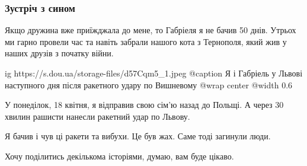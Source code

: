  
 
 
 
 

\subsubsection{Зустріч з сином}

Якщо дружина вже приїжджала до мене, то Габріеля я не бачив 50 днів. Утрьох ми
гарно провели час та навіть забрали нашого кота з Тернополя, який жив у наших
друзів з початку війни.

\ifcmt
  ig https://s.dou.ua/storage-files/d57Cqm5_1.jpeg
	@caption Я і Габріель у Львові наступного дня після ракетного удару по Вишневому
  @wrap center
  @width 0.6
\fi

У понеділок, 18 квітня, я відправив свою сім'ю назад до Польщі. А через 30
хвилин рашисти нанесли ракетний удар по Львову.

Я бачив і чув ці ракети та вибухи. Це був жах. Саме тоді загинули люди.

Хочу поділитись декількома історіями, думаю, вам буде цікаво.
